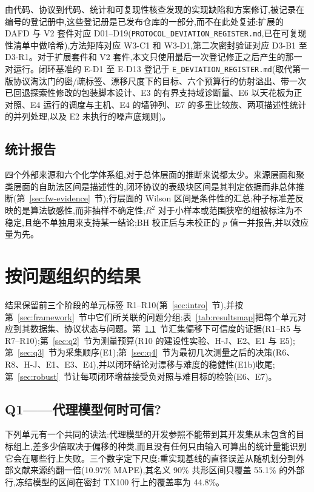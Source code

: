 \documentclass[11pt,a4paper]{ctexart}
\newcommand{\tox}{TX100}
\begin{document}
由代码、协议到代码、统计和可复现性核查发现的实现缺陷和方案修订,被记录在编号的登记册中,这些登记册是已发布仓库的一部分,而不在此处复述:扩展的 DAFD 与 V2 套件对应 D01–D19(\texttt{PROTOCOL\_DEVIATION\_REGISTER.md},已在可复现性清单中做哈希),方法矩阵对应 W3-C1 和 W3-D1,第二次密封验证对应 D3-B1 至 D3-R1。对于扩展套件和 V2 套件,本文只使用最后一次登记修正之后产生的那一对运行。闭环基准的 E-D1 至 E-D13 登记于 \texttt{E\_DEVIATION\_REGISTER.md}(取代第一版协议淘汰门的密/疏标签、漂移尺度下的目标、六个预算行的仿射溢出、带一次已回退探索性修改的包装脚本设计、E3 的有界支持域诊断量、E6 以天花板为正对照、E4 运行的调度与主机、E4 的墙钟列、E7 的多重比较族、两项描述性统计的并列处理,以及 E2 未执行的噪声底规则)。

\subsection{统计报告}
\label{sec:stats}

四个外部来源和六个化学体系组,对于总体层面的推断来说都太少。来源层面和聚类层面的自助法区间是描述性的,闭环协议的表级块区间是其判定依据而非总体推断(第~\ref{sec:fw-evidence}~节);行层面的 Wilson 区间是条件性的汇总;种子标准差反映的是算法敏感性,而非抽样不确定性;$R^2$ 对于小样本或范围狭窄的组被标注为不稳定,且绝不单独用来支持某一结论;BH 校正后与未校正的 $p$ 值一并报告,并以效应量为先。

\section{按问题组织的结果}
\label{sec:results}
结果保留前三个阶段的单元标签 R1--R10(第~\ref{sec:intro}~节),并按第~\ref{sec:framework}~节中它们所关联的问题分组;表~\ref{tab:resultsmap}把每个单元对应到其数据集、协议状态与问题。第~\ref{sec:q1}~节汇集偏移下可信度的证据(R1--R5 与 R7--R10);第~\ref{sec:q2}~节为测量预算(R10 的建设性实验、H-J、E2、E1 与 E5);第~\ref{sec:q3}~节为采集顺序(E1);第~\ref{sec:q4}~节为最初几次测量之后的决策(R6、R8、H-J、E1、E3、E4),并以闭环结论对漂移与难度的稳健性(E1b)收尾;第~\ref{sec:robust}~节让每项闭环增益接受负对照与难目标的检验(E6、E7)。

\subsection{Q1——代理模型何时可信?}
\label{sec:q1}
下列单元有一个共同的读法:代理模型的开发参照不能带到其开发集从未包含的目标组上,差多少倍取决于偏移的种类,而且没有任何只由输入可算出的统计量能识别它会在哪些行上失败。三个数字定下尺度:重实现基线的直径误差从随机划分到外部文献来源约翻一倍(10.97\% MAPE),其名义 90\% 共形区间只覆盖 55.1\% 的外部行,冻结模型的区间在密封 \tox{} 行上的覆盖率为 44.8\%。
\end{document}
